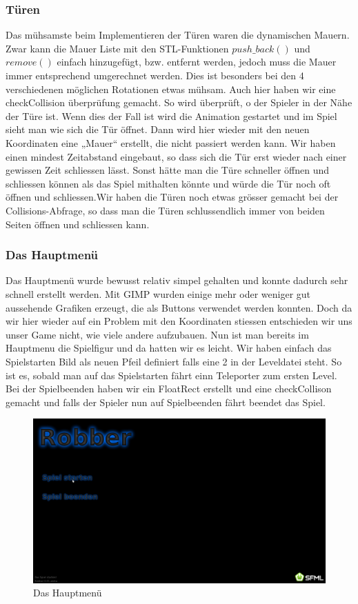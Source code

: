 \documentclass[12pt,a4paper]{scrartcl}
\begin{document}
\subsubsection{Türen}
Das mühsamste beim Implementieren der Türen waren die dynamischen Mauern. Zwar kann die Mauer Liste mit den
STL-Funktionen $push\_back()$ und $remove()$ einfach hinzugefügt, bzw. entfernt werden, jedoch muss die Mauer
immer entsprechend umgerechnet werden. Dies ist besonders bei den 4 verschiedenen möglichen Rotationen etwas mühsam.
Auch hier haben wir eine checkCollision überprüfung gemacht. So wird überprüft, o der Spieler in der Nähe der Türe ist. Wenn dies der Fall ist wird die Animation gestartet und im Spiel sieht man wie sich die Tür öffnet. Dann wird hier wieder mit den neuen Koordinaten eine „Mauer“ erstellt, die nicht passiert werden kann. Wir haben einen mindest Zeitabstand eingebaut, so dass sich die Tür erst wieder nach einer gewissen Zeit schliessen lässt. Sonst hätte man die Türe schneller öffnen  und schliessen können als das Spiel mithalten könnte und würde die Tür noch oft öffnen und schliessen.Wir haben die Türen noch etwas grösser gemacht bei der Collisions-Abfrage, so dass man die Türen schlussendlich immer von beiden Seiten öffnen und schliessen kann.

\subsubsection{Das Hauptmenü}
Das Hauptmenü wurde bewusst relativ simpel gehalten und konnte dadurch sehr schnell erstellt werden. Mit GIMP wurden
einige mehr oder weniger gut aussehende Grafiken erzeugt, die als Buttons verwendet werden konnten. Doch da wir hier wieder auf ein Problem mit den Koordinaten stiessen entschieden wir uns unser Game nicht, wie viele andere aufzubauen. Nun ist man bereits im Hauptmenu die Spielfigur  und da hatten wir es leicht. Wir haben einfach das Spielstarten Bild als neuen Pfeil definiert falls eine 2 in der Leveldatei steht. So ist es, sobald man auf das Spielstarten fährt einn Teleporter zum ersten Level. Bei der Spielbeenden haben wir ein FloatRect erstellt und eine checkCollison gemacht und falls der Spieler nun auf Spielbeenden fährt beendet das Spiel. 
\begin{figure}
\centering
\includegraphics[scale=0.3]{img/hauptmenu.png}
\caption{Das Hauptmenü}
\end{figure}
\end{document}
